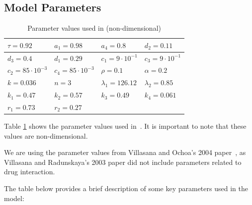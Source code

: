 \subsection{Model Parameters}

\begin{table}[ht]
\centering
\begin{tabular}{|l|l|l|l|}
\hline
$\tau = 0.92$          & $a_1 = 0.98$         & $a_4 = 0.8$            & $d_2 = 0.11$           \\ \hline
$d_3 = 0.4$            & $d_1 = 0.29$         & $c_1 = 9\cdot 10^{-1}$ & $c_3 = 9\cdot 10^{-1}$ \\ \hline
$c_2 = 85\cdot10^{-3}$ & $c_4=85\cdot10^{-3}$ & $\rho = 0.1$           & $\alpha = 0.2$         \\ \hline
$k=0.036$              & $n=3$                & $\lambda_1=126.12$     & $\lambda_2=0.85$       \\ \hline
$k_1=0.47$             & $k_2=0.57$           & $k_3=0.49$             & $k_4 = 0.061$          \\ \hline
$r_1 = 0.73$            & $r_2 = 0.27$         &                        &                        \\ \hline
\end{tabular}
\caption{Parameter values used in \cite{villasana_heuristic_2004} (non-dimensional)}
\label{table:parameter values}
\end{table}

Table \ref{table:parameter values} shows the parameter values used in~\cite{villasana_heuristic_2004}. It is important to note that these values are non-dimensional.

We are using the parameter values from Villasana and Ochoa's 2004 paper~\cite{villasana_heuristic_2004}, as Villasana and Radunskaya's 2003 paper did not include parameters related to drug interaction.~\cite{villasana_delay_2003}

The table below provides a brief description of some key parameters used in the model:

